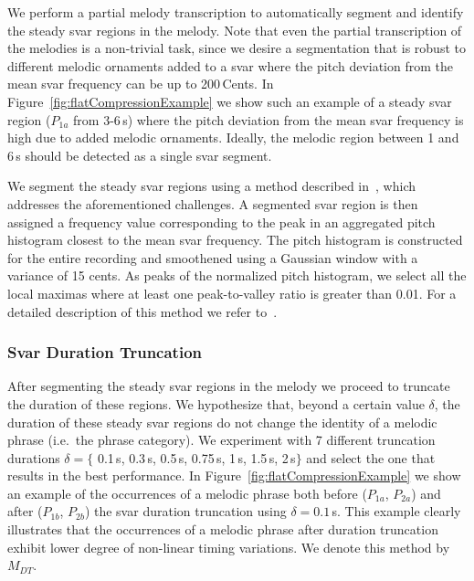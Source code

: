 We perform a partial melody transcription to automatically segment and identify the steady svar regions in the melody. Note that even the partial transcription of the melodies is a non-trivial task, since we desire a segmentation that is robust to different melodic ornaments added to a svar where the pitch deviation from the mean svar frequency can be up to 200\,Cents. In Figure~\ref{fig:flatCompressionExample} we show such an example of a steady svar region ($P_{1a}$ from 3-6\,s) where the pitch deviation from the mean svar frequency is high due to added melodic ornaments. Ideally, the melodic region between 1 and 6\,s should be detected as a single svar segment.

We segment the steady svar regions using a method described in~\cite{gulati2014Landmark}, which addresses the aforementioned challenges. A segmented svar region is then assigned a frequency value corresponding to the peak in an aggregated pitch histogram closest to the mean svar frequency. The pitch histogram is constructed for the entire recording and smoothened using a Gaussian window with a variance of 15 cents. As peaks of the normalized pitch histogram, we select all the local maximas where at least one peak-to-valley ratio is greater than 0.01. For a detailed description of this method we refer to~\cite{gulati2014Landmark}. 

 
\subsubsection{Svar Duration Truncation}
\label{sec:patterns_improving_similarity_svara_duration_trucation}

After segmenting the steady svar regions in the melody we proceed to truncate the duration of these regions. We hypothesize that, beyond a certain value $\delta$, the duration of these steady svar regions do not change the identity of a melodic phrase (i.e.~the phrase category). We experiment with 7 different truncation durations $\delta = \lbrace$ 0.1\,s, 0.3\,s, 0.5\,s, 0.75\,s, 1\,s, 1.5\,s, 2\,s$\rbrace$ and select the one that results in the best performance. In Figure~\ref{fig:flatCompressionExample}
we show an example of the occurrences of a melodic phrase both before ($P_{1a}$, $P_{2a}$) and after ($P_{1b}$, $P_{2b}$) the svar duration truncation using $\delta = 0.1$\,s. This example clearly illustrates that the occurrences of a melodic phrase after duration truncation exhibit lower degree of non-linear timing variations. We denote this method by $M_{DT}$.

